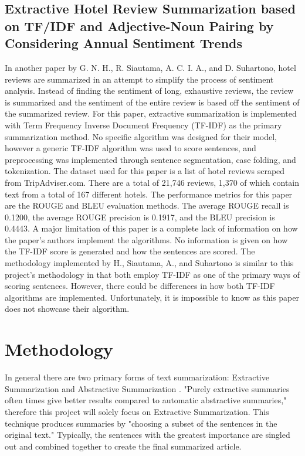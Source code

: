 \documentclass{IEEEtran}
\begin{document}
\subsection{Extractive Hotel Review Summarization based on TF/IDF and Adjective-Noun Pairing by Considering Annual Sentiment Trends \cite{related_work_2}}
In another paper by G. N. H., R. Siautama, A. C. I. A., and D. Suhartono, hotel reviews are summarized in an attempt to simplify the process of sentiment analysis. Instead of finding the sentiment of long, exhaustive reviews, the review is summarized and the sentiment of the entire review is based off the sentiment of the summarized review. For this paper, extractive summarization is implemented with Term Frequency Inverse Document Frequency (TF-IDF) as the primary summarization method. No specific algorithm was designed for their model, however a generic TF-IDF algorithm was used to score sentences, and preprocessing was implemented through sentence segmentation, case folding, and tokenization. The dataset used for this paper is a list of hotel reviews scraped from TripAdviser.com. There are a total of 21,746 reviews, 1,370 of which contain text from a total of 167 different hotels. The performance metrics for this paper are the ROUGE and BLEU evaluation methods. The average ROUGE recall is 0.1200, the average ROUGE precision is 0.1917, and the BLEU precision is 0.4443. A major limitation of this paper is a complete lack of information on how the paper’s authors implement the algorithms. No information is given on how the TF-IDF score is generated and how the sentences are scored. The methodology implemented by H., Siautama, A., and Suhartono is similar to this project's methodology in that both employ TF-IDF as one of the primary ways of scoring sentences. However, there could be differences in how both TF-IDF algorithms are implemented. Unfortunately, it is impossible to know as this paper does not showcase their algorithm.

\section{Methodology}
In general there are two primary forms of text summarization: Extractive Summarization and Abstractive Summarization \cite{related_summarization}.  "Purely extractive summaries often times give better results compared to automatic abstractive summaries," \cite{related_summarization} therefore this project will solely focus on Extractive Summarization. This technique produces summaries by "choosing a subset of the sentences in the original text." \cite{related_summarization} Typically, the sentences with the greatest importance are singled out and combined together to create the final summarized article. \cite{related_summarization}
\end{document}
